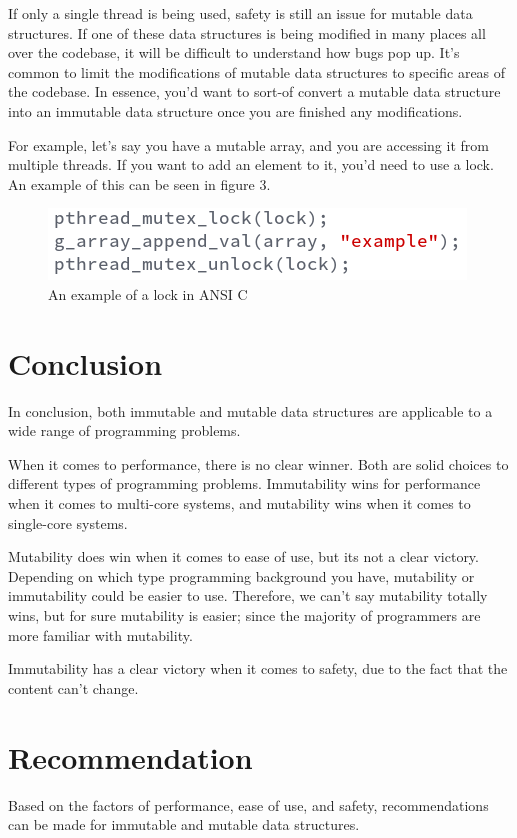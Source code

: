 \documentclass[11pt]{article}
\begin{document}
If only a single thread is being used, safety is still an issue for mutable
data structures. If one of these data structures is being modified in many
places all over the codebase, it will be difficult to understand how bugs pop
up. It's common to limit the modifications of mutable data structures to
specific areas of the codebase. In essence, you'd want to sort-of convert a
mutable data structure into an immutable data structure once you are finished
any modifications.

For example, let's say you have a mutable array, and you are accessing
it from multiple threads. If you want to add an element to it, you'd need to
use a lock. An example of this can be seen in figure 3.

\begin{figure}[H]
\centering

\includegraphics[scale=0.7]{mutex}
\caption{An example of a lock in ANSI C}

\end{figure}

\section*{Conclusion}
In conclusion, both immutable and mutable data structures are applicable to a
wide range of programming problems.

When it comes to performance, there is no clear winner. Both are solid choices
to different types of programming problems. Immutability wins for performance
when it comes to multi-core systems, and mutability wins when it comes to
single-core systems.

Mutability does win when it comes to ease of use, but its not a clear victory.
Depending on which type programming background you have, mutability or
immutability could be easier to use. Therefore, we can't say mutability totally
wins, but for sure mutability is easier; since the majority of programmers
are more familiar with mutability.

Immutability has a clear victory when it comes to safety, due to the fact that
the content can't change.

\section*{Recommendation}
Based on the factors of performance, ease of use, and safety, recommendations
can be made for immutable and mutable data structures.
\end{document}
